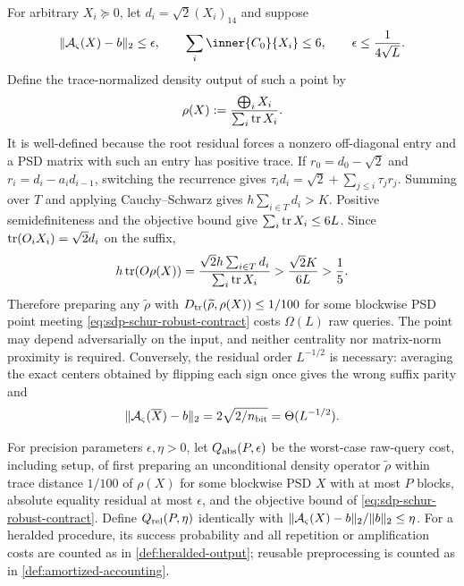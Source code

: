 For arbitrary $X_i\succeq0$, let $d_i=\sqrt2(X_i)_{14}$ and suppose
\begin{equation}
 \norm{\mathcal A_\varsigma(X)-b}_2\leq\epsilon,\qquad
 \sum_i\inner{C_0}{X_i}\leq6,\qquad
 \epsilon\leq\frac1{4\sqrt L}.                            \label{eq:sdp-schur-robust-contract}
\end{equation}
Define the trace-normalized density output of such a point by
\begin{equation}
 \rho(X):=\frac{\bigoplus_iX_i}{\sum_i\operatorname{tr} X_i}.             \label{eq:sdp-schur-robust-density}
\end{equation}
It is well-defined because the root residual forces a nonzero off-diagonal
entry and a PSD matrix with such an entry has positive trace.  If
$r_0=d_0-\sqrt2$ and $r_i=d_i-a_id_{i-1}$, switching the recurrence gives
$\tau_id_i=\sqrt2+\sum_{j\leq i}\tau_jr_j$.  Summing over $T$ and applying
Cauchy--Schwarz gives $h\sum_{i\in T}d_i>K$.  Positive semidefiniteness and
the objective bound give
$\sum_i\operatorname{tr} X_i\leq6L$.  Since $\operatorname{tr}(O_iX_i)=\sqrt2d_i$ on the suffix,
\begin{equation}
 h\operatorname{tr}(O\rho(X))
 =\frac{\sqrt2h\sum_{i\in T}d_i}{\sum_i\operatorname{tr} X_i}
 >\frac{\sqrt2K}{6L}>\frac15.                              \label{eq:sdp-schur-robust-bias}
\end{equation}
Therefore preparing any $\widetilde\rho$ with
$D_{\mathrm{tr}}(\widetilde\rho,\rho(X))\leq1/100$ for some blockwise PSD point meeting
\eqref{eq:sdp-schur-robust-contract} costs $\Omega(L)$ raw queries.  The
point may depend adversarially on the input, and neither centrality nor
matrix-norm proximity is required.  Conversely, the residual order $L^{-1/2}$
is necessary: averaging the exact centers obtained
by flipping each sign once gives the wrong suffix parity and
\begin{equation}
 \lVert\mathcal A_\varsigma(\overline X)-b\rVert_2
 =2\sqrt{2/n_{\rm bit}}=\Theta(L^{-1/2}).                  \label{eq:sdp-schur-wrong-mixture}
\end{equation}

For precision parameters $\epsilon,\eta>0$, let
$Q_{\rm abs}(P,\epsilon)$ be the worst-case raw-query cost, including setup,
of first preparing an unconditional density operator
$\widetilde\rho$ within trace distance $1/100$ of $\rho(X)$ for some
blockwise PSD $X$ with at most $P$ blocks, absolute equality residual at
most $\epsilon$, and the objective bound of
\eqref{eq:sdp-schur-robust-contract}.  Define
$Q_{\rm rel}(P,\eta)$ identically with
$\lVert\mathcal A_\varsigma(X)-b\rVert_2/\lVert b\rVert_2\leq\eta$.
For a heralded procedure, its success probability and all repetition or
amplification costs are counted as in \cref{def:heralded-output}; reusable
preprocessing is counted as in \cref{def:amortized-accounting}.

